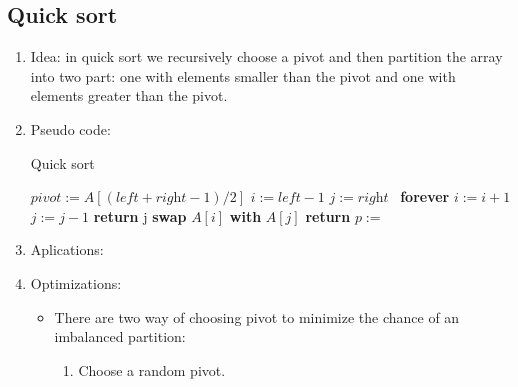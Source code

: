 \documentclass[12pt]{article}
\begin{document}
    \subsection{Quick sort}
    \begin{enumerate}
        \item Idea: in quick sort we recursively choose a pivot and then partition the array into two part: one with elements smaller than the pivot and one with elements greater than the pivot.
        \item Pseudo code:
        \begin{algorithm}[H]
            \caption{Quick sort}
            \begin{algorithmic}[1]
                    \State $\textit{pivot}:=A[(\textit{left}+\textit{right}-1)/2]$
                    \State $i:=\textit{left}-1$
                    \State $j:=\textit{right}$
                    \Loop\ \textbf{forever}
                    \Do
                        \State $i:=i+1$
                    \Do
                        \State $j:=j-1$
                        \State \textbf{return} j
                    \EndIf
                    \State \textbf{swap} $A[i]$ \textbf{with} $A[j]$
                    \EndLoop
                \EndFunction
                \State
                        \State \textbf{return}
                    \EndIf
                    \State $p:=$\ 
                    \State {}
                    \State {}
                \EndFunction
            \end{algorithmic}
        \end{algorithm}
        \item Aplications:
        \item Optimizations:
        \begin{itemize}
            \item There are two way of choosing pivot to minimize the chance of an imbalanced partition:
            \begin{enumerate}
                \item Choose a random pivot.

\end{enumerate}
\end{itemize}
\end{enumerate}
\end{document}
